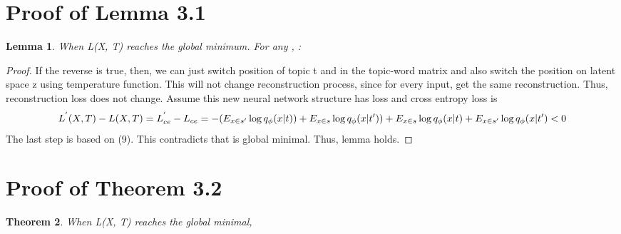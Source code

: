 \documentclass[11pt]{article}
\newtheorem{theorem}{Theorem}[section]
\newtheorem{lemma}[theorem]{Lemma}
\begin{document}
\section{Proof of Lemma 3.1}
\label{appendix:proof}
\begin{lemma} When L(X, T) reaches the global minimum. For any , : 


\end{lemma}
\begin{proof}
If the reverse is true, then, we can just switch position of topic t and  in the topic-word matrix  and also switch the position on latent space z using temperature function. This will not change reconstruction process, since for every input, get the same reconstruction. Thus, reconstruction loss does not change. Assume this new neural network structure has loss  and cross entropy loss is 
\begin{dmath}
L^{'}(X, T) - L(X, T)
 = L^{'}_{ce} - L_{ce} 
 = - (E_{x \in s'} \log q_{\phi}(x|t)) + E_{x \in s} \log q_{\phi}(x|t')) 
 + E_{x \in s} \log q_{\phi}(x|t) +  E_{x \in s'} \log q_{\phi}(x|t')   
 < 0  \\
\end{dmath}The last step is based on (9). This contradicts that  is global minimal.  Thus, lemma holds.
\end{proof}



\section{Proof of Theorem 3.2}
\begin{theorem}


When L(X, T) reaches the global minimal, 
\end{theorem}
\end{document}

